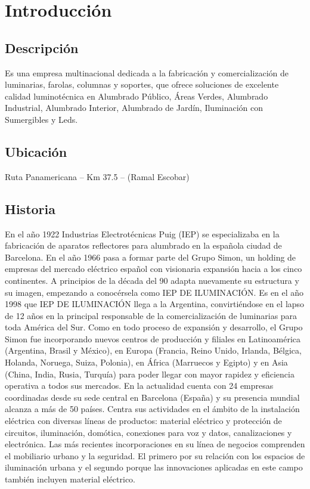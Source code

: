 \section{Introducci\'on}
\subsection{Descripción}
Es una empresa multinacional dedicada a la fabricación y comercialización de luminarias, farolas, columnas y soportes, que ofrece soluciones de excelente calidad luminotécnica en Alumbrado Público, Áreas Verdes, Alumbrado Industrial, Alumbrado Interior, Alumbrado de Jardín, Iluminación con Sumergibles y Leds.

\subsection{Ubicación}
Ruta Panamericana – Km 37.5 – (Ramal Escobar)

\subsection{Historia}
En el año 1922 Industrias Electrotécnicas Puig (IEP) se especializaba en la fabricación de aparatos reflectores para alumbrado en la española ciudad de Barcelona.
En el año 1966 pasa a formar parte del Grupo Simon, un holding de empresas del mercado eléctrico español con visionaria expansión hacia a los cinco continentes.
A principios de la década del 90 adapta nuevamente su estructura y su imagen, empezando a conocérsela como IEP DE ILUMINACIÓN.
Es en el año 1998 que IEP DE ILUMINACIÓN llega a la Argentina, convirtiéndose en el lapso de 12 años en la principal responsable de la comercialización de luminarias para toda América del Sur. 
Como en todo proceso de expansión y desarrollo, el Grupo Simon fue incorporando nuevos centros de producción y filiales en Latinoamérica (Argentina, Brasil y México), en Europa (Francia, Reino Unido, Irlanda, Bélgica, Holanda, Noruega, Suiza, Polonia), en África (Marruecos y Egipto) y en Asia (China, India, Rusia, Turquía) para poder llegar con mayor rapidez y eficiencia operativa a todos sus mercados.
En la actualidad cuenta con 24 empresas coordinadas desde su sede central en Barcelona (España) y su presencia mundial alcanza a más de 50 países. Centra sus actividades en el ámbito de la instalación eléctrica con diversas líneas de productos: material eléctrico y protección de circuitos, iluminación, domótica, conexiones para voz y datos, canalizaciones y electrónica. Las más recientes incorporaciones en su línea de negocios comprenden el mobiliario urbano y la seguridad. El primero por su relación con los espacios de iluminación urbana y el segundo porque las innovaciones aplicadas en este campo también incluyen material eléctrico.

